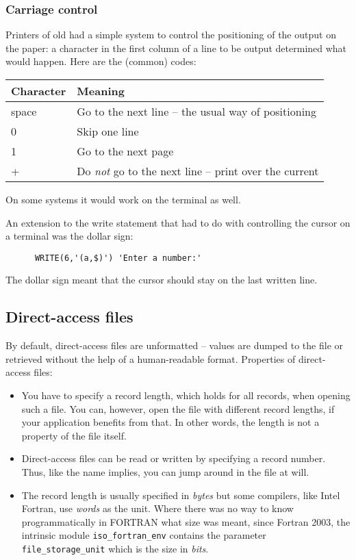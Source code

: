 \subsubsection{Carriage control}
Printers of old had a simple system to control the positioning of the output on the paper:
a character in the first column of a line to be output determined what would happen. Here
are the (common) codes:
\begin{table}[h!]
\begin{tabular}{ll}
\hline
Character    & Meaning \\
\hline
space        & Go to the next line -- the usual way of positioning \\
0            & Skip one line \\
1            & Go to the next page \\
+            & Do \emph{not} go to the next line -- print over the current \\
\end{tabular}
\end{table}

On some systems it would work on the terminal as well.

An extension to the write statement that had to do with controlling the cursor on a
terminal was the dollar sign:
\begin{verbatim}
      WRITE(6,'(a,$)') 'Enter a number:'
\end{verbatim}

The dollar sign meant that the cursor should stay on the last written line.


\subsection{Direct-access files}
By default, direct-access files are unformatted -- values are dumped to the file or retrieved
without the help of a human-readable format. Properties of direct-access files:
\begin{itemize}
\item
You have to specify a record length, which holds for all records, when opening such a file.
You can, however, open the file with different record lengths, if your application benefits
from that. In other words, the length is not a property of the file itself.
\item
Direct-access files can be read or written by specifying a record number. Thus, like the name
implies, you can jump around in the file at will.
\item
The record length is usually specified in \emph{bytes} but some compilers, like Intel Fortran,
use \emph{words} as the unit. Where there was no way to know programmatically in FORTRAN what
size was meant, since Fortran 2003, the intrinsic module \verb+iso_fortran_env+ contains the parameter \verb+file_storage_unit+
which is the size in \emph{bits}.
\end{itemize}

